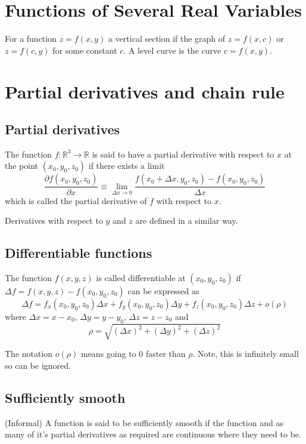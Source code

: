 \documentclass[12pt]{article}
\begin{document}

\tableofcontents
\pagebreak

\section{Functions of Several Real Variables}
	\begin{defn} 
		For a function $z = f(x,y)$ a vertical section if the graph of $z = f(x,c)$ or $z = f(c,y)$ 
		for some constant $c$. A level curve is the curve $c = f(x,y)$.
	\end{defn}

\section{Partial derivatives and chain rule}

	\subsection{Partial derivatives}
	\begin{defn}
		The function $f: \mathbb{R}^3 \to \mathbb{R}$ is said to have a partial derivative with respect to $x$
		at the point $(x_0, y_0, z_0)$ if there exists a limit
			\[
				\frac{\partial f (x_0, y_0, z_0)}{\partial x} \equiv \lim_{\Delta x \to 0} 
				\frac{f(x_0 + \Delta x, y_0, z_0) - f(x_0, y_0, z_0)}{\Delta x}
			\]
		which is called the partial derivative of $f$ with respect to $x$.
	\end{defn}
	
	Derivatives with respect to $y$ and $z$ are defined in a similar way.

	\subsection{Differentiable functions}
	\begin{defn}
		The function $f(x,y,z)$ is called differentiable at $(x_0, y_0, z_0)$ if 
		$\Delta f = f(x,y,z) - f(x_0, y_0, z_0)$ can be expressed as
		\[
			\Delta f = f_x(x_0, y_0, z_0) \Delta x + f_y(x_0, y_0, z_0) \Delta y + f_z(x_0, y_0, z_0) \Delta z + o(\rho)
		\]
		where $\Delta x = x - x_0$, $\Delta y = y - y_0$, $\Delta z = z - z_0$ and 
		\[
			\rho = \sqrt{ (\Delta x)^2 + (\Delta y)^2 + (\Delta z)^2 }
		\]
	\end{defn}
	The notation $o(\rho)$ means going to $0$ faster than $\rho$. Note, this is infinitely small so can be ignored.
	
	\subsection{Sufficiently smooth}
	\begin{defn}
		(Informal) A function is said to be sufficiently smooth if the function and as many of it's partial derivatives as required are continuous where they need to be.
	\end{defn}
	
\end{document}

